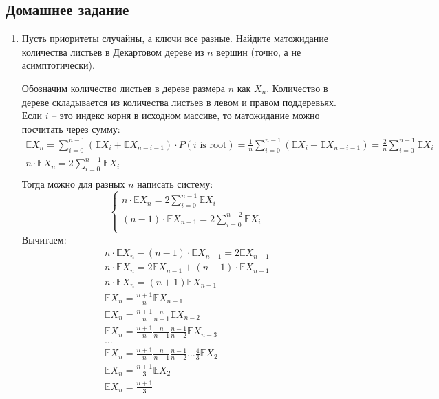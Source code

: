
\subsection{Домашнее задание}
\begin{enumerate}

  \item
    Пусть приоритеты случайны, а ключи все разные. Найдите матожидание количества листьев в
    Декартовом дереве из $n$ вершин (точно, а не асимптотически).
    \begin{solution}
      Обозначим количество листьев в дереве размера $n$ как $X_n$. Количество в дереве складывается из количества листьев в левом и правом поддеревьях. Если $i$ -- это индекс корня в исходном массиве, то матожидание можно посчитать через сумму:
      \begin{eqnarray}
        \mathbb{E}X_n = \sum_{i=0}^{n-1} (\mathbb{E}X_{i}+\mathbb{E}X_{n-i-1})\cdot P(i \text{ is root}) = \frac{1}{n} \sum_{i=0}^{n-1} (\mathbb{E}X_{i}+\mathbb{E}X_{n-i-1}) = \frac{2}{n} \sum_{i=0}^{n-1} \mathbb{E}X_{i} \\
        n \cdot \mathbb{E}X_n = 2 \sum_{i=0}^{n-1} \mathbb{E}X_{i} \\
      \end{eqnarray}
      Тогда можно для разных $n$ написать систему:
      \begin{equation}
        \begin{cases}
          n \cdot \mathbb{E}X_n = 2 \sum_{i=0}^{n-1} \mathbb{E}X_{i} \\
          (n-1) \cdot \mathbb{E}X_{n-1} = 2 \sum_{i=0}^{n-2} \mathbb{E}X_{i} \\
        \end{cases}
      \end{equation}
      Вычитаем:
      \begin{eqnarray}
        n \cdot \mathbb{E}X_n - (n-1) \cdot \mathbb{E}X_{n-1} = 2 \mathbb{E}X_{n-1} \\
        n \cdot \mathbb{E}X_n = 2 \mathbb{E}X_{n-1} + (n-1) \cdot \mathbb{E}X_{n-1} \\
        n \cdot \mathbb{E}X_n = (n+1) \mathbb{E}X_{n-1} \\
        \mathbb{E}X_n = \frac{n+1}{n} \mathbb{E}X_{n-1} \\
        \mathbb{E}X_n = \frac{n+1}{n} \frac{n}{n-1} \mathbb{E}X_{n-2} \\
        \mathbb{E}X_n = \frac{n+1}{n} \frac{n}{n-1} \frac{n-1}{n-2} \mathbb{E}X_{n-3} \\
        \ldots \\
        \mathbb{E}X_n = \frac{n+1}{n} \frac{n}{n-1} \frac{n-1}{n-2} \ldots \frac{4}{3} \mathbb{E}X_{2} \\
        \mathbb{E}X_n = \frac{n+1}{3} \mathbb{E}X_{2} \\
        \mathbb{E}X_n = \frac{n+1}{3} \\
      \end{eqnarray}
    \end{solution}


\end{enumerate}
